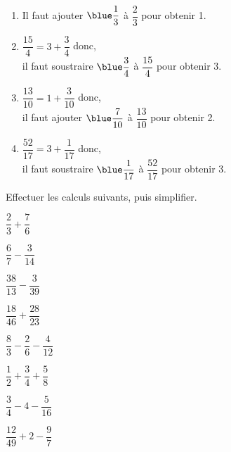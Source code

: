 \begin{colonne*exercice}
\begin{corrige}
   \ \\ [-5mm]
   \begin{enumerate}
      \item Il faut ajouter $\blue \dfrac13$ à $\dfrac23$ pour obtenir 1. \bigskip
      \item $\dfrac{15}{4} =3+\dfrac34$ donc, \\ [1mm]
         il faut soustraire $\blue \dfrac34$ à $\dfrac{15}{4}$ pour obtenir 3. \bigskip
      \item $\dfrac{13}{10} =1+\dfrac{3}{10}$ donc, \\ [1mm]
         il faut ajouter $\blue \dfrac{7}{10}$ à $\dfrac{13}{10}$ pour obtenir 2. \bigskip
      \item $\dfrac{52}{17} =3+\dfrac{1}{17}$ donc, \\ [1mm]
         il faut soustraire $\blue \dfrac{1}{17}$ à $\dfrac{52}{17}$ pour obtenir 3. \bigskip
   \end{enumerate}
\end{corrige}

\bigskip


\begin{exercice} %
   Effectuer les calculs suivants, puis simplifier. \smallskip
   \begin{colenumerate}{2}
      \item $\dfrac23+\dfrac76$ \smallskip
      \item $\dfrac67-\dfrac3{14}$ \smallskip
      \item $\dfrac{38}{13}-\dfrac3{39}$ \smallskip
      \item $\dfrac{18}{46}+\dfrac{28}{23}$ \smallskip
      \item $\dfrac83-\dfrac26-\dfrac4{12}$
      \item $\dfrac12+\dfrac34+\dfrac58$
      \item $\dfrac34-4-\dfrac5{16}$
      \item $\dfrac{12}{49}+2-\dfrac97$
   \end{colenumerate}
\end{exercice}


\end{colonne*exercice}
